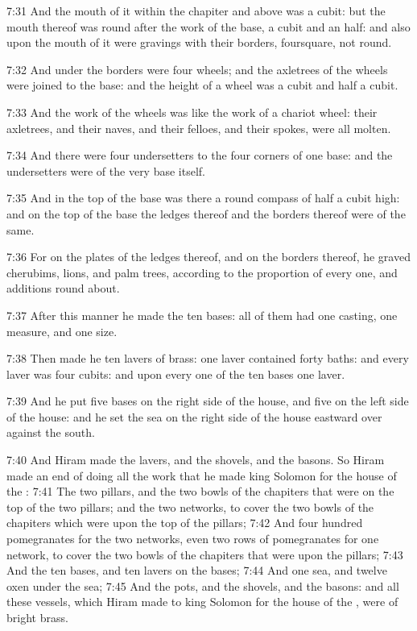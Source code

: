 7:31 And the mouth of it within the chapiter and above was a cubit: but the mouth thereof was round after the work of the base, a cubit and an half: and also upon the mouth of it were gravings with their borders, foursquare, not round.

7:32 And under the borders were four wheels; and the axletrees of the wheels were joined to the base: and the height of a wheel was a cubit and half a cubit.

7:33 And the work of the wheels was like the work of a chariot wheel: their axletrees, and their naves, and their felloes, and their spokes, were all molten.

7:34 And there were four undersetters to the four corners of one base: and the undersetters were of the very base itself.

7:35 And in the top of the base was there a round compass of half a cubit high: and on the top of the base the ledges thereof and the borders thereof were of the same.

7:36 For on the plates of the ledges thereof, and on the borders thereof, he graved cherubims, lions, and palm trees, according to the proportion of every one, and additions round about.

7:37 After this manner he made the ten bases: all of them had one casting, one measure, and one size.

7:38 Then made he ten lavers of brass: one laver contained forty baths: and every laver was four cubits: and upon every one of the ten bases one laver.

7:39 And he put five bases on the right side of the house, and five on the left side of the house: and he set the sea on the right side of the house eastward over against the south.

7:40 And Hiram made the lavers, and the shovels, and the basons. So Hiram made an end of doing all the work that he made king Solomon for the house of the \LORD: 7:41 The two pillars, and the two bowls of the chapiters that were on the top of the two pillars; and the two networks, to cover the two bowls of the chapiters which were upon the top of the pillars; 7:42 And four hundred pomegranates for the two networks, even two rows of pomegranates for one network, to cover the two bowls of the chapiters that were upon the pillars; 7:43 And the ten bases, and ten lavers on the bases; 7:44 And one sea, and twelve oxen under the sea; 7:45 And the pots, and the shovels, and the basons: and all these vessels, which Hiram made to king Solomon for the house of the \LORD, were of bright brass.

